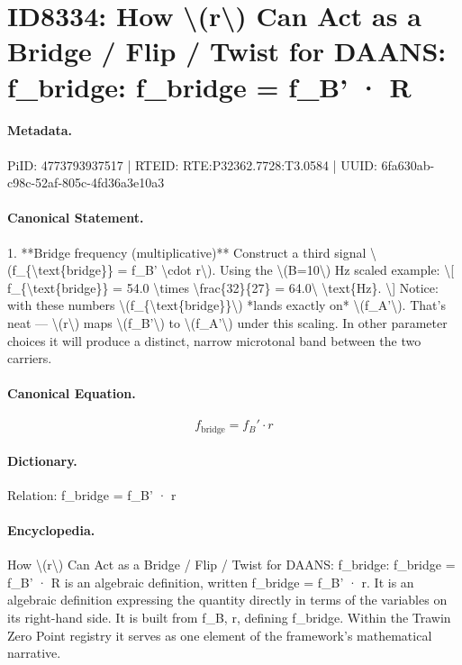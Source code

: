 \section*{ID8334: How \textbackslash{}(r\textbackslash{}) Can Act as a Bridge / Flip / Twist for DAANS: f\_bridge: f\_bridge = f\_B' · R}
\paragraph{Metadata.}
PiID: 4773793937517 | RTEID: RTE:P32362.7728:T3.0584 | UUID: 6fa630ab-c98c-52af-805c-4fd36a3e10a3

\paragraph{Canonical Statement.}
1. **Bridge frequency (multiplicative)** Construct a third signal \textbackslash{}(f\_\{\textbackslash{}text\{bridge\}\} = f\_B' \textbackslash{}cdot r\textbackslash{}). Using the \textbackslash{}(B=10\textbackslash{}) Hz scaled example: \textbackslash{}[ f\_\{\textbackslash{}text\{bridge\}\} = 54.0 \textbackslash{}times \textbackslash{}frac\{32\}\{27\} = 64.0\textbackslash{} \textbackslash{}text\{Hz\}. \textbackslash{}] Notice: with these numbers \textbackslash{}(f\_\{\textbackslash{}text\{bridge\}\}\textbackslash{}) *lands exactly on* \textbackslash{}(f\_A'\textbackslash{}). That’s neat — \textbackslash{}(r\textbackslash{}) maps \textbackslash{}(f\_B'\textbackslash{}) to \textbackslash{}(f\_A'\textbackslash{}) under this scaling. In other parameter choices it will produce a distinct, narrow microtonal band between the two carriers.

\paragraph{Canonical Equation.}
\[
f_{\text{bridge}} = f_B' \cdot r
\]

\paragraph{Dictionary.}
Relation: f\_bridge = f\_B' · r

\paragraph{Encyclopedia.}
How \textbackslash{}(r\textbackslash{}) Can Act as a Bridge / Flip / Twist for DAANS: f\_bridge: f\_bridge = f\_B' · R is an algebraic definition, written f\_bridge = f\_B' · r. It is an algebraic definition expressing the quantity directly in terms of the variables on its right-hand side. It is built from f\_B, r, defining f\_bridge. Within the Trawin Zero Point registry it serves as one element of the framework's mathematical narrative.
